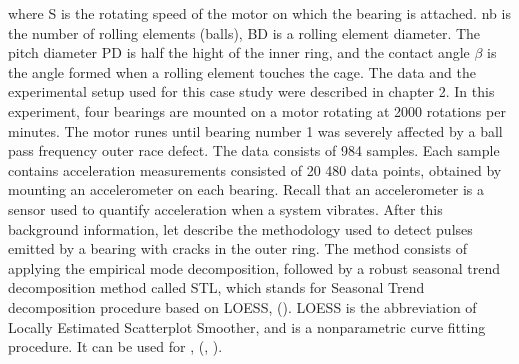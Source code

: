 \documentclass[../Main/thesis.tex]{subfiles}
\begin{document}
where S is the rotating speed of the motor on which the bearing is attached. nb is the number of rolling elements (balls), BD is a rolling element diameter. The pitch diameter PD is half the hight of the inner ring, and the contact angle $\beta$ is the angle formed when a rolling element touches the cage. The data and the experimental setup used for this case study were described in chapter 2. In this experiment, four bearings are mounted on a motor rotating at 2000 rotations per minutes. The motor runes until bearing number 1 was severely affected by a ball pass frequency outer race defect. The data consists of 984 samples. Each sample contains  acceleration measurements consisted of 20 480 data points, obtained by mounting an accelerometer on each bearing. Recall that an accelerometer is a sensor used to quantify acceleration when a system vibrates. After this background information, let describe the methodology used to detect pulses emitted by a bearing with cracks in the outer ring.
\justify
The method consists of applying the empirical mode decomposition, followed by a robust seasonal trend decomposition method called STL, which stands for Seasonal Trend decomposition procedure based on LOESS,  (\cite{Cleveland-et-al-1990}). LOESS is the abbreviation of Locally Estimated Scatterplot Smoother, and is a nonparametric curve fitting procedure. It can be used for , (\cite{Cleveland-1979}, \cite{Cleveland-et-al-1988}).
\justify
\end{document}
